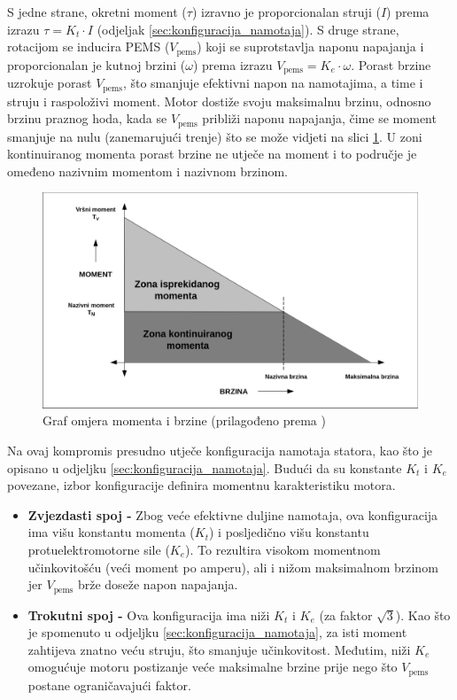 \documentclass[diplomskirad]{fer}
\begin{document}
S jedne strane, okretni moment ($\tau$) izravno je proporcionalan struji ($I$)
prema izrazu $\tau = K_t \cdot I$ (odjeljak \ref{sec:konfiguracija_namotaja}).
S druge strane, rotacijom se inducira PEMS ($V_{\text{pems}}$) koji se
suprotstavlja naponu napajanja i proporcionalan je kutnoj brzini ($\omega$)
prema izrazu $V_{\text{pems}} = K_e \cdot \omega$. Porast brzine uzrokuje
porast $V_{\text{pems}}$, što smanjuje efektivni napon na namotajima, a time i
struju i raspoloživi moment. Motor dostiže svoju maksimalnu brzinu, odnosno
brzinu praznog hoda, kada se $V_{\text{pems}}$ približi naponu napajanja, čime
se moment smanjuje na nulu (zanemarujući trenje) što se može vidjeti na slici
\ref{fig:torque_speed}. U zoni kontinuiranog momenta porast brzine ne utječe na
moment i to područje je omeđeno nazivnim momentom i nazivnom brzinom.

\begin{figure}[h!]
	\centering
	\includegraphics[width=\textwidth]{Figures/microchip_torque_speed.png}
	\caption{Graf omjera momenta i brzine (prilagođeno prema \cite{MicrochipAN885})}
	\label{fig:torque_speed}
\end{figure}

Na ovaj kompromis presudno utječe konfiguracija namotaja statora, kao što je
opisano u odjeljku \ref{sec:konfiguracija_namotaja}. Budući da su konstante
$K_t$ i $K_e$ povezane, izbor konfiguracije definira momentnu karakteristiku
motora.

\begin{itemize}
	\item \textbf{Zvjezdasti spoj -} Zbog veće efektivne duljine namotaja, ova konfiguracija ima višu konstantu momenta ($K_t$) i posljedično višu konstantu protuelektromotorne sile ($K_e$). To rezultira visokom momentnom učinkovitošću (veći moment po amperu), ali i nižom maksimalnom brzinom jer $V_{\text{pems}}$ brže doseže napon napajanja.

	\item \textbf{Trokutni spoj -} Ova konfiguracija ima niži $K_t$ i $K_e$ (za faktor $\sqrt{3}$). Kao što je spomenuto u odjeljku \ref{sec:konfiguracija_namotaja}, za isti moment zahtijeva znatno veću struju, što smanjuje učinkovitost. Međutim, niži $K_e$ omogućuje motoru postizanje veće maksimalne brzine prije nego što $V_{\text{pems}}$ postane ograničavajući faktor.
\end{itemize}
\end{document}

